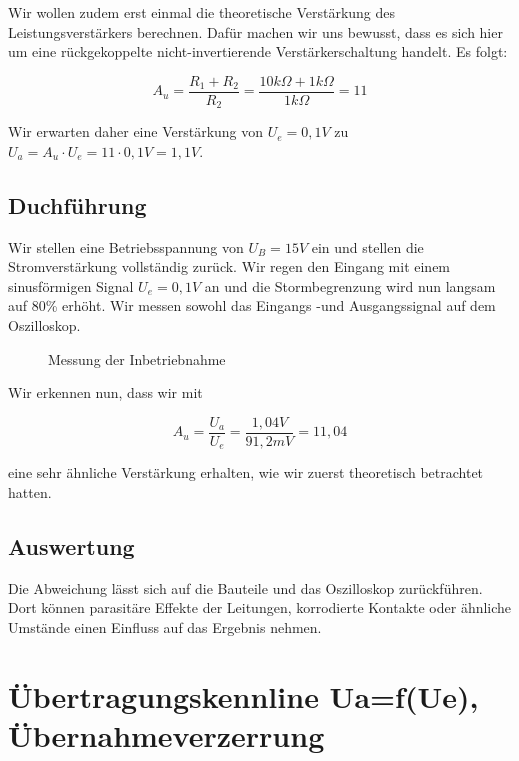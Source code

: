 \documentclass{article}
\begin{document}
Wir wollen zudem erst einmal die theoretische Verstärkung des Leistungsverstärkers berechnen. Dafür machen wir uns bewusst, dass es sich hier um eine rückgekoppelte nicht-invertierende Verstärkerschaltung handelt. Es folgt:

\begin{equation}
  \label{eq:1}
  A_{u} = \frac{R_{1}+R_{2}}{R_{2}} = \frac{10k\Omega + 1k\Omega}{1k\Omega} = 11
\end{equation}

Wir erwarten daher eine Verstärkung von $U_{e} = 0,1V$ zu $U_{a} = A_{u} \cdot U_{e} = 11 \cdot 0,1V = 1,1V$.

\subsection{Duchführung}
\label{sec:duchfuhrung}

Wir stellen eine Betriebsspannung von $U_{B} = 15V$ ein und stellen die Stromverstärkung vollständig zurück. Wir regen den Eingang mit einem sinusförmigen Signal $U_{e} = 0,1V$ an und die Stormbegrenzung wird nun langsam auf 80\% erhöht. Wir messen sowohl das Eingangs -und Ausgangssignal auf dem Oszilloskop.

\begin{figure}[h]
  \centering

  \caption{Messung der Inbetriebnahme}
  \label{fig:osziinbetrieb}
\end{figure}

Wir erkennen nun, dass wir mit

\begin{equation*}
  A_{u} = \frac{U_{a}}{U_{e}} = \frac{1,04V}{91,2mV} = 11,04
\end{equation*}

eine sehr ähnliche Verstärkung erhalten, wie wir zuerst theoretisch betrachtet hatten.

\subsection{Auswertung}
\label{sec:auswertung}

Die Abweichung lässt sich auf die Bauteile und das Oszilloskop zurückführen. Dort können parasitäre Effekte der Leitungen, korrodierte Kontakte oder ähnliche Umstände einen Einfluss auf das Ergebnis nehmen.

\newpage
\section{Übertragungskennline Ua=f(Ue), Übernahmeverzerrung}
\label{sec:ubertr-ua=f-ubern}
\end{document}
